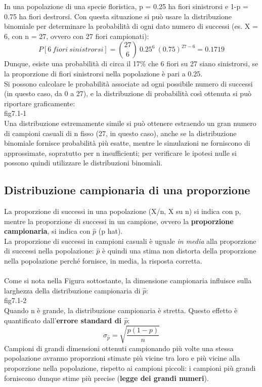 \documentclass[drafts, 10pt]{book}
\newcounter{example}[section]
\begin{document}
\begin{example}
In una popolazione di una specie floristica, p = 0.25 ha fiori sinistrorsi e 1-p = 0.75 ha fiori destrorsi. Con questa situazione si può usare la distribuzione binomiale per determinare la probabilità di ogni dato numero di successi (es. X = 6, con n = 27, ovvero con 27 fiori campionati):
\begin{equation}
P[6 \ fiori \ sinistrorsi] = \binom{27}{6} \ 0.25^6 \ (0.75)^{27-6} = 0.1719
\end{equation}
Dunque, esiste una probabilità di circa il 17\% che 6 fiori su 27 siano sinistrorsi, se la proporzione di fiori sinistrorsi nella popolazione è pari a 0.25.
\\
Si possono calcolare le probabilità associate ad ogni possibile numero di successi (in questo caso, da 0 a 27), e la distribuzione di probabilità così ottenuta si può riportare graficamente:
\\
fig7.1-1 \label{fig7.1-1} %
\\
Una distribuzione estremamente simile si può ottenere estraendo un gran numero di campioni casuali di n fisso (27, in questo caso), anche se la distribuzione binomiale fornisce probabilità più esatte, mentre le simulazioni ne forniscono di approssimate, sopratutto per n insufficienti; per verificare le ipotesi nulle si possono quindi utilizzare le distribuzioni binomiali.
\end{example}

\subsection{Distribuzione campionaria di una proporzione}
La proporzione di successi in una popolazione (X/n, X su n) si indica con p, mentre la proporzione di successi in un campione, ovvero la \textbf{proporzione campionaria}, si indica con $\hat{p}$ (p hat).
\\
La proporzione di successi in campioni casuali è uguale \textit{in media} alla proporzione di successi nella popolazione: $\hat{p}$ è quindi una stima non distorta della proporzione nella popolazione perché fornisce, in media, la risposta corretta.
\\
\\
Come si nota nella Figura sottostante, la dimensione campionaria influisce sulla larghezza della distribuzione campionaria di $\hat{p}$:
\\
fig7.1-2\label{fig7.-2} %
\\
Quando n è grande, la distribuzione campionaria è stretta. Questo effetto è quantificato dall'\textbf{errore standard di $\hat{p}$}:
\begin{equation}
\sigma_{\hat{p}} = \sqrt{\frac{p(1-p)}{n}}
\end{equation}
\label{devstphat}
Campioni di grandi dimensioni ottenuti campionando più volte una stessa popolazione avranno proporzioni stimate più vicine tra loro e più vicine alla proporzione nella popolazione, rispetto ai campioni piccoli: i campioni più grandi forniscono dunque stime più precise (\textbf{legge dei grandi numeri}).
\end{document}
